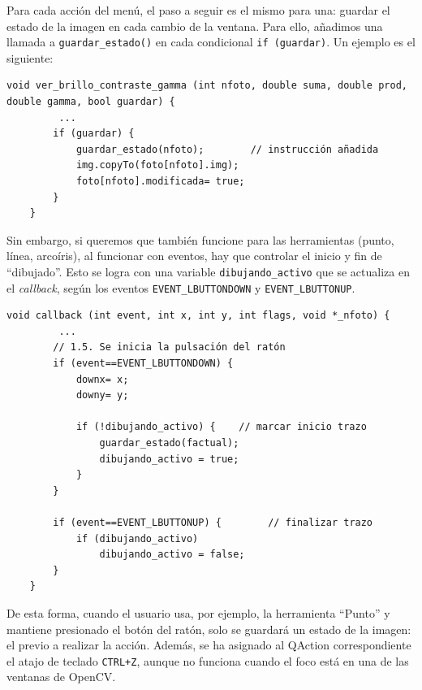 \documentclass[11pt]{article}
\begin{document}
          Para cada acción del menú, el paso a seguir es el mismo para una: guardar el
          estado de la imagen en cada cambio de la ventana. Para ello, añadimos una
          llamada a \texttt{guardar\_estado()} en cada condicional \texttt{if (guardar)}.
          Un ejemplo es el siguiente:

          \begin{lstlisting}[style=CppQtStyle]
    void ver_brillo_contraste_gamma (int nfoto, double suma, double prod, double gamma, bool guardar) {
         ...
        if (guardar) {
            guardar_estado(nfoto);        // instrucción añadida
            img.copyTo(foto[nfoto].img);
            foto[nfoto].modificada= true;
        }
    }
\end{lstlisting}

          \clearpage

          \clearpage

          Sin embargo, si queremos que también funcione para las herramientas (punto,
          línea, arcoíris), al funcionar con eventos, hay que controlar el inicio y fin
          de ``dibujado''. Esto se logra con una variable \texttt{dibujando\_activo} que
          se actualiza en el \textit{callback}, según los eventos
          \texttt{EVENT\_LBUTTONDOWN} y \texttt{EVENT\_LBUTTONUP}.

          \begin{lstlisting}[style=CppQtStyle]
    void callback (int event, int x, int y, int flags, void *_nfoto) {
         ...
        // 1.5. Se inicia la pulsación del ratón
        if (event==EVENT_LBUTTONDOWN) {
            downx= x;
            downy= y;

            if (!dibujando_activo) {    // marcar inicio trazo
                guardar_estado(factual);
                dibujando_activo = true;
            }
        }

        if (event==EVENT_LBUTTONUP) {        // finalizar trazo
            if (dibujando_activo)
                dibujando_activo = false;
        }
    }
\end{lstlisting}

          \noindent
          De esta forma, cuando el usuario usa, por ejemplo, la herramienta ``Punto'' y mantiene presionado el botón del ratón, solo se guardará un estado de la imagen: el previo a realizar la acción. Además, se ha asignado al QAction correspondiente el atajo de teclado \texttt{CTRL+Z}, aunque no funciona cuando el foco está en una de las ventanas de OpenCV.
\end{document}
